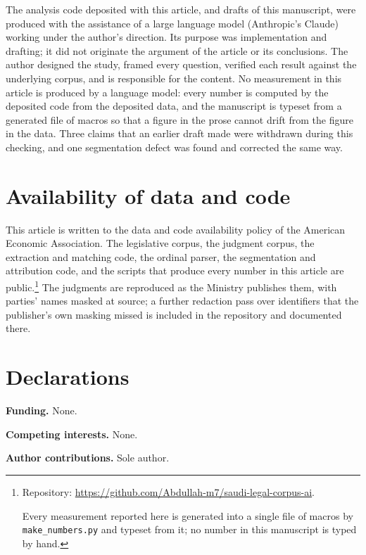 \documentclass[11pt]{article}
\newif\ifanon
\begin{document}
The analysis code deposited with this article, and drafts of this manuscript,
were produced with the assistance of a large language model (Anthropic's Claude)
working under the author's direction. Its purpose was implementation and
drafting; it did not originate the argument of the article or its
conclusions. The author designed the study, framed every question, verified
each result against the underlying corpus, and is responsible for the
content. No measurement in this article is produced by a
language model: every number is computed by the deposited code from the
deposited data, and the manuscript is typeset from a generated file of macros
so that a figure in the prose cannot drift from the figure in the data. Three
claims that an earlier draft made were withdrawn during this checking, and
one segmentation defect was found and corrected the same way.

\section*{Availability of data and code}

This article is written to the data and code availability policy of the
American Economic Association. The legislative corpus, the judgment corpus,
the extraction and matching code, the ordinal parser, the segmentation and
attribution code, and the scripts that produce every number in this article
are public.\footnote{%
\ifanon
Repository withheld for anonymous review: it carries the author's name. It
holds the corpus, the analysis code, and the replication guide, and will be
cited in full in the accepted version.
\else
Repository: \url{https://github.com/Abdullah-m7/saudi-legal-corpus-ai}.
\fi
Every measurement reported here is generated into a single file of macros by
\texttt{make\_numbers.py} and typeset from it; no number in this manuscript is
typed by hand.} The judgments are reproduced as the Ministry publishes them,
with parties' names masked at source; a further redaction pass over
identifiers that the publisher's own masking missed is included in the
repository and documented there.

\ifanon\else
\section*{Declarations}

\noindent\textbf{Funding.} None.

\noindent\textbf{Competing interests.} None.

\noindent\textbf{Author contributions.} Sole author.
\fi
\end{document}
